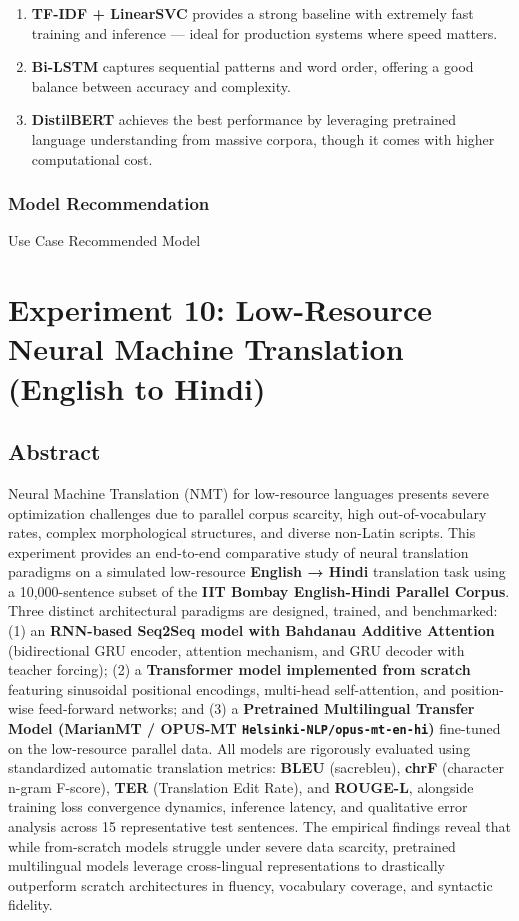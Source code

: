 \documentclass[12pt,a4paper,oneside]{report}
\providecommand{\tightlist}{\setlength{\itemsep}{0pt}\setlength{\parskip}{0pt}}
\begin{document}
\begin{enumerate}
\def\labelenumi{\arabic{enumi}.}
\tightlist
\item
  \textbf{TF-IDF + LinearSVC} provides a strong baseline with extremely fast training and inference --- ideal for production systems where speed matters.
\item
  \textbf{Bi-LSTM} captures sequential patterns and word order, offering a good balance between accuracy and complexity.
\item
  \textbf{DistilBERT} achieves the best performance by leveraging pretrained language understanding from massive corpora, though it comes with higher computational cost.
\end{enumerate}

\hypertarget{model-recommendation}{%
\subsection{Model Recommendation}\label{model-recommendation}}

Use Case \textbar{} Recommended Model \textbar{}\\

\chapter{Experiment 10: Low-Resource Neural Machine Translation (English to Hindi)}
\section{Abstract}
Neural Machine Translation (NMT) for low-resource languages presents severe optimization challenges due to parallel corpus scarcity, high out-of-vocabulary rates, complex morphological structures, and diverse non-Latin scripts. This experiment provides an end-to-end comparative study of neural translation paradigms on a simulated low-resource \textbf{English → Hindi} translation task using a 10,000-sentence subset of the \textbf{IIT Bombay English-Hindi Parallel Corpus}. Three distinct architectural paradigms are designed, trained, and benchmarked: (1) an \textbf{RNN-based Seq2Seq model with Bahdanau Additive Attention} (bidirectional GRU encoder, attention mechanism, and GRU decoder with teacher forcing); (2) a \textbf{Transformer model implemented from scratch} featuring sinusoidal positional encodings, multi-head self-attention, and position-wise feed-forward networks; and (3) a \textbf{Pretrained Multilingual Transfer Model (MarianMT / OPUS-MT \texttt{Helsinki-NLP/opus-mt-en-hi})} fine-tuned on the low-resource parallel data. All models are rigorously evaluated using standardized automatic translation metrics: \textbf{BLEU} (sacrebleu), \textbf{chrF} (character n-gram F-score), \textbf{TER} (Translation Edit Rate), and \textbf{ROUGE-L}, alongside training loss convergence dynamics, inference latency, and qualitative error analysis across 15 representative test sentences. The empirical findings reveal that while from-scratch models struggle under severe data scarcity, pretrained multilingual models leverage cross-lingual representations to drastically outperform scratch architectures in fluency, vocabulary coverage, and syntactic fidelity.
\end{document}
